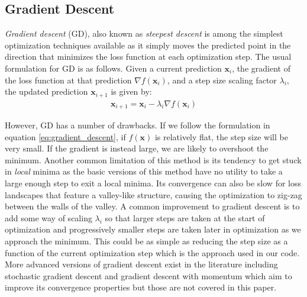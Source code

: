 \documentclass[11pt, letterpaper]{extarticle} %
\begin{document}
\subsection{Gradient Descent}\label{subsec:gradient_descent}
\textit{Gradient descent} (GD), also known as \textit{steepest descent} is among the simplest optimization techniques available as it simply moves the predicted point in the direction that minimizes the loss function at each optimization step. The usual formulation for GD is as follows. Given a current prediction $\mathbf{x}_i$, the gradient of the loss function at that prediction $\nabla f(\mathbf{x}_i)$, and a step size scaling factor $\lambda_i$, the updated prediction $\mathbf{x}_{i+1}$ is given by:
\begin{align} \label{eq:gradient_descent}
    \mathbf{x}_{i+1} = \mathbf{x}_i - \lambda_i \nabla f(\mathbf{x}_i)
\end{align}

However, GD has a number of drawbacks. If we follow the formulation in equation \ref{eq:gradient_descent}, if $f(\mathbf{x})$ is relatively flat, the step size will be very small. If the gradient is instead large, we are likely to overshoot the minimum. Another common limitation of this method is its tendency to get stuck in \textit{local} minima as the basic versions of this method have no utility to take a large enough step to exit a local minima. Its convergence can also be slow for loss landscapes that feature a valley-like structure, causing the optimization to zig-zag between the walls of the valley. A common improvement to gradient descent is to add some way of scaling $\lambda_i$ so that larger steps are taken at the start of optimization and progressively smaller steps are taken later in optimization as we approach the minimum. This could be as simple as reducing the step size as a function of the current optimization step which is the approach used in our code. More advanced versions of gradient descent exist in the literature including stochastic gradient descent and gradient descent with momentum which aim to improve its convergence properties but those are not covered in this paper.
\end{document}
